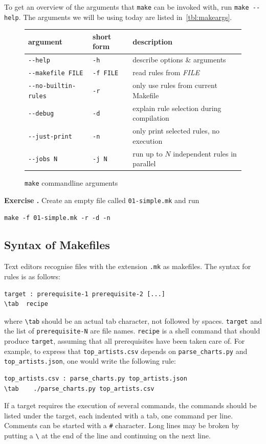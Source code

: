 \documentclass[a4paper,11pt]{article}
\newcounter{exercisectr}
\newcommand{\exercise}[1]{%
\par%
\stepcounter{exercisectr}%
\vspace{\baselineskip}%
\noindent\textbf{Exercise \arabic{exercisectr}\ifthenelse{\equal{#1}{}}{}{ : #1}%
.}\quad%
}
\begin{document}
To get an overview of the arguments that \texttt{make} can be invoked with, run \verb|make --help|. The arguments we will be using today are listed in~\autoref{tbl:makeargs}.
%
\begin{figure}[h]
  \centering
  \begin{tabular}[h]{l l l}
    argument & short form & description \\ \hline
    \verb|--help| & \verb|-h| & describe options \& arguments \\
    \verb|--makefile FILE| & \verb|-f FILE| & read rules from \emph{FILE} \\
    \verb|--no-builtin-rules| & \verb|-r| & only use rules from current Makefile \\
    \verb|--debug| & \verb|-d| & explain rule selection during compilation \\
    \verb|--just-print| & \verb|-n| & only print selected rules, no  execution \\
    \verb|--jobs N| & \verb|-j N| & run up to $N$ independent rules in parallel
  \end{tabular}
  \caption{\texttt{make} commandline arguments}
  \label{tbl:makeargs}
\end{figure}
%

\exercise{} Create an empty file called \verb|01-simple.mk| and run
\begin{verbatim}
make -f 01-simple.mk -r -d -n
\end{verbatim}


\subsection{Syntax of Makefiles}
\label{sec:syntax-makefiles}

Text editors recognise files with the extension \verb|.mk| as makefiles. The
syntax for rules is as follows:
%
\begin{verbatim}
target : prerequisite-1 prerequisite-2 [...]
\tab  recipe
\end{verbatim}
%
where \verb|\tab| should be an actual tab character, not followed by spaces. \verb|target| and the list of \verb|prerequisite-N| are file names. \verb|recipe| is a shell command that should produce \verb|target|, assuming that all prerequisites have been taken care of. For example, to express that \verb|top_artists.csv| depends on \verb|parse_charts.py| and \verb|top_artists.json|, one would write the following rule:
\begin{verbatim}
top_artists.csv : parse_charts.py top_artists.json
\tab	./parse_charts.py top_artists.csv
\end{verbatim}
%
If a target requires the execution of several commands, the commands should be listed under the target, each indented with a tab, one command per line.
%
Comments can be started with a \verb|#| character. Long lines may be broken by putting a \verb|\| at the end of the line and continuing on the next line.
\end{document}
